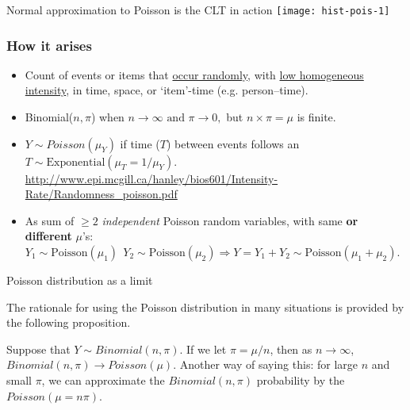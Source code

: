 \documentclass[10pt,handout]{beamer}\usepackage[]{graphicx}\usepackage[]{color}
\begin{document}
\begin{frame}{Normal approximation to Poisson is the CLT in action}
	\texttt{[image: hist-pois-1]} 
\end{frame}	



\begin{frame}
	\frametitle{How it arises}
	
	
	\begin{itemize}
		\setlength\itemsep{1em}
		\item  Count of events or items that \underline{occur randomly}, with \underline{low homogeneous intensity}, in time, space, or `item'-time (e.g. person--time). 
		\item Binomial($n,\pi$) when $n \rightarrow \infty\textrm{ and } \pi \rightarrow 0,$ but $n \times \pi = \mu$ is finite.
		\item $Y\sim Poisson(\mu_Y)$ if time ($T$) between events follows an $T \sim \textrm{Exponential}(\mu_{T} = 1/\mu_{Y}).$ 
		{ \scriptsize   \url{http://www.epi.mcgill.ca/hanley/bios601/Intensity-Rate/Randomness_poisson.pdf}} 
		\item  As sum of $\ge 2$  \textit{independent} Poisson random variables, 
		with same \textbf{or different} $\mu$'s: \newline 
		$Y_{1} \sim \textrm{Poisson}(\mu_{1}) \: \:   
		Y_{2} \sim \textrm{Poisson}(\mu_{2}) \Rightarrow Y = Y_{1} + Y_{2} \sim \textrm{Poisson}(\mu_{1}+\mu_{2}).$
	\end{itemize}
\end{frame}




\begin{frame}{Poisson distribution as a limit}
	
	The rationale for using the Poisson distribution in many situations is provided by the following proposition.
	
	\vspace*{0.5in}
	
	\begin{proposition}
		Suppose that $Y \sim Binomial(n,\pi)$. If we let $\pi = \mu/n$, then as $n \rightarrow \infty$, $Binomial(n,\pi) \rightarrow Poisson(\mu)$. Another way of saying this: for large $n$ and small $\pi$, we can approximate the $Binomial(n,\pi)$ probability by the $Poisson(\mu = n\pi)$. 
	\end{proposition}
	
\end{frame}
\end{document}
